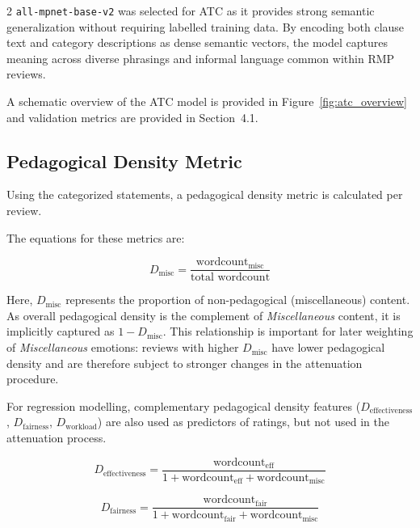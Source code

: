 \documentclass{article}
\begin{document}
\begin{multicols*}{2}
\texttt{all-mpnet-base-v2} was selected for ATC as it provides strong semantic generalization without requiring labelled training data. By encoding both clause text and category descriptions as dense semantic vectors, the model captures meaning across diverse phrasings and informal language common within RMP reviews. 

A schematic overview of the ATC model is provided in Figure~\ref{fig:atc_overview} and validation metrics are provided in Section~4.1.

\subsection{Pedagogical Density Metric} 
Using the categorized statements, a pedagogical density metric is calculated per review.

The equations for these metrics are:\newline

\begin{equation}
D_{\text{misc}} =
\frac{\text{wordcount}_{\text{misc}}}
{\text{total wordcount}}
\end{equation}

Here, $D_{\text{misc}}$ represents the proportion of non-pedagogical (miscellaneous) content. As overall pedagogical density is the complement of \textit{Miscellaneous} content, it is implicitly captured as $1 - D_{\text{misc}}$. This relationship is important for later weighting of \textit{Miscellaneous} emotions: reviews with higher $D_{\text{misc}}$ have lower pedagogical density and are therefore subject to stronger changes in the attenuation procedure.

For regression modelling, complementary pedagogical density features ($D_{\text{effectiveness}}$, $D_{\text{fairness}}$, $D_{\text{workload}}$) are also used as predictors of ratings, but not used in the attenuation process.\newline


\begin{equation}
D_{\text{effectiveness}} =
\frac{\text{wordcount}_{\text{eff}}}
{1 + \text{wordcount}_{\text{eff}} + \text{wordcount}_{\text{misc}}}
\end{equation}

\begin{equation}
D_{\text{fairness}} =
\frac{\text{wordcount}_{\text{fair}}}
{1 + \text{wordcount}_{\text{fair}} + \text{wordcount}_{\text{misc}}}
\end{equation}


\end{multicols*}
\end{document}
